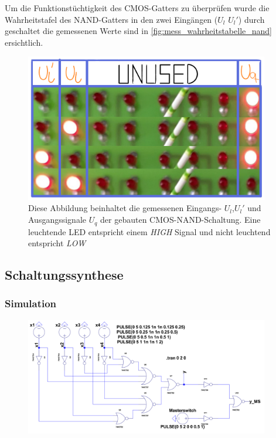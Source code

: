 \documentclass[12pt,english,ngerman]{scrartcl}
\begin{document}
Um die Funktionstüchtigkeit des CMOS-Gatters zu überprüfen wurde die
Wahrheitstafel des NAND-Gatters in den zwei Eingängen ($U_l$ $U_l'$) durch
geschaltet die gemessenen Werte sind in \autoref{fig:mess_wahrheitstabelle_nand}
ersichtlich.


\begin{figure}[H]
  \centering
    \includegraphics[width=0.95\textwidth]{./figures/messungen/WahrheitstabelleNAND.pdf}
  \caption{Diese Abbildung beinhaltet die gemessenen Eingangs- $U_l$,$U_l'$ und
  Ausgangssignale $U_q$ der gebauten CMOS-NAND-Schaltung. Eine leuchtende
  LED entspricht einem \textit{HIGH} Signal und nicht leuchtend entspricht
  \textit{LOW}}
  \label{fig:mess_wahrheitstabelle_nand}
\end{figure}


\subsection{Schaltungssynthese}
\subsubsection{Simulation}


\begin{figure}[H]
  \centering
    \includegraphics[width=0.95\textwidth]{./simdaten_lab/logic/schaltung.png}
  \caption{}
  \label{fig:sim_aufbau_alarm}
\end{figure}
\end{document}
